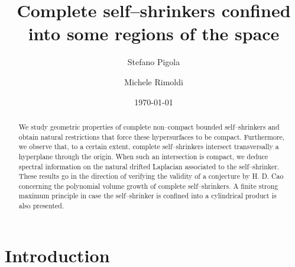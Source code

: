 \documentclass[11pt,leqno]{amsart}\usepackage{amsmath}
\numberwithin{equation}{section}
\begin{document}
\title[Complete self--shrinkers into some regions of the space]{Complete self--shrinkers confined into some regions of the space}

\begin{abstract}
We study geometric properties of complete non--compact bounded self--shrinkers and obtain natural restrictions that force these hypersurfaces to be compact. Furthermore, we observe that, to a certain extent, complete self--shrinkers intersect transversally a hyperplane through the origin. When such an intersection is compact, we deduce spectral information on the natural drifted Laplacian associated to the self--shrinker. These results go in the direction of verifying the validity of a conjecture by H. D. Cao concerning the polynomial volume growth of complete self--shrinkers. A finite strong maximum principle in case the self--shrinker is confined into a cylindrical product is also presented.
\end{abstract}

\date{\today}

\author {Stefano Pigola}
\address{Dipartimento di Scienza e Alta Tecnologia\\
Universit\`a degli Studi dell'Insubria\\
via Valleggio 11\\
I-22100 Como, ITALY}

\author{Michele Rimoldi}
\address{Dipartimento di Scienza e Alta Tecnologia\\
Universit\`a degli Studi dell'Insubria\\
via Valleggio 11\\
I-22100 Como, ITALY}



\maketitle

\tableofcontents

\section*{Introduction}
\end{document}
